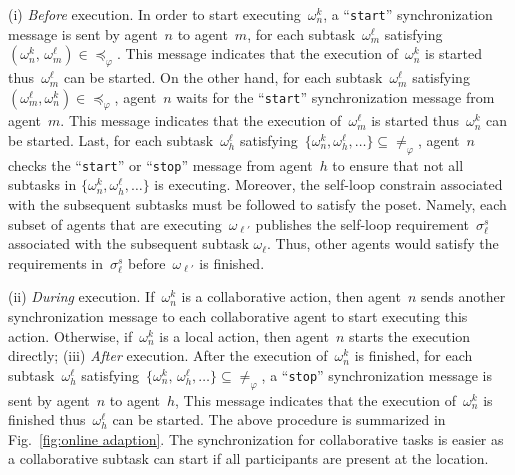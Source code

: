 (i) \emph{Before} execution.
In order to start executing~$\omega^k_n$,
a ``\texttt{start}'' synchronization message is sent by agent~$n$ to agent~$m$,
for each subtask~$\omega^\ell_m$
satisfying~$(\omega^k_n,\,\omega^\ell_m)\in \preceq_{\varphi}$.
This message indicates that the execution of~$\omega^k_n$ is started
thus~$\omega^\ell_m$ can be started.
On the other hand, for each subtask~$\omega^\ell_m$
satisfying~$(\omega^\ell_m, \omega^k_n)\in \preceq_{\varphi}$,
agent~$n$ waits for the ``\texttt{start}'' synchronization message
from agent~$m$.
This message indicates that the execution of~$\omega^\ell_m$ is started
thus~$\omega^k_n$ can be started.
Last, for each subtask~$\omega^\ell_h$
satisfying~$\{\omega^k_n,\omega^\ell_h,\dots\}\subseteq \neq_{\varphi}$,
agent~$n$ checks the ``\texttt{start}'' or ``\texttt{stop}'' message
from agent~$h$ to ensure that not all subtasks in $\{\omega^k_n,\omega^\ell_h,\dots\}$ is executing.
Moreover, the self-loop constrain associated with the subsequent subtasks must be
followed to satisfy the poset.
Namely, each subset of agents that are executing~$\omega_{\ell'}$ publishes
the self-loop requirement~$\sigma^s_\ell$ associated with the subsequent subtask $\omega_\ell$.
Thus, other agents would satisfy the requirements in~$\sigma^s_\ell$
before~$\omega_{\ell'}$ is finished.


(ii) \emph{During} execution.
If~$\omega^k_n$ is a collaborative action, then
agent~$n$ sends another synchronization message to each collaborative agent
to start executing this action.
Otherwise, if~$\omega^k_n$ is a local action, then agent~$n$ starts the
execution directly;
(iii) \emph{After} execution.
After the execution of~$\omega^k_n$ is finished,
for each subtask~$\omega^\ell_h$
satisfying~$\{\omega^k_n,\,\omega^\ell_h,\dots\}\subseteq \neq_{\varphi}$,
a ``\texttt{stop}'' synchronization message is sent by agent~$n$ to agent~$h$,
This message indicates that the execution of~$\omega^k_n$ is finished
thus~$\omega^\ell_h$ can be started.
The above procedure is summarized in Fig.~\ref{fig:online adaption}.
The synchronization for collaborative tasks is easier as a collaborative
subtask can start if all participants are present at the location.

